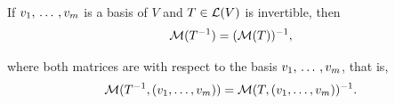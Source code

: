   \setcounter{thm}{85}
  \begin{thm}
    If $v_1, {\, \ldots \,\,}, v_m$ is a basis of $V$ and $T \in \mathcal{L}(V)$ is invertible, then
    \begin{equation}
      \mathcal{M}(T^{-1}) = (\mathcal{M}(T))^{-1},
    \end{equation}

    where both matrices are with respect to the basis $v_1, {\, \ldots \,\,}, v_m$, that is,
    \begin{equation}
      \mathcal{M}(T^{-1}, (v_1, \dots, v_m)) =\mathcal{M}(T, (v_1, \dots, v_m))^{-1}.
    \end{equation}
  \end{thm}